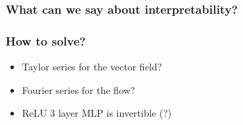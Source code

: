 \documentclass{article} %
\theoremstyle{definition} \newtheorem{definition}{Definition}
\theoremstyle{remark} \newtheorem{remark}{Remark}
\begin{document}
\subsubsection{What can we say about interpretability?}


\subsubsection{How to solve?}
\begin{itemize}
\item Taylor series for the vector field?
\item Fourier series for the flow?
\item ReLU 3 layer MLP is invertible (?)
\end{itemize}



\newpage


\end{document}
